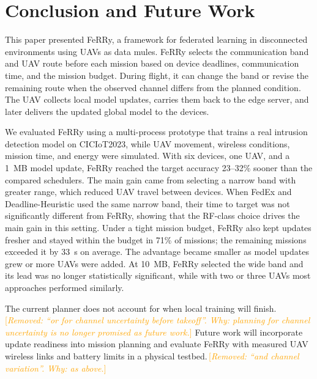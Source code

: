 \documentclass[conference]{IEEEtran}
\newcommand{\sysname}{FeRRy}
\newcommand{\changenote}[1]{\textcolor{orange}{\,[\emph{#1}]}}
\begin{document}
\section{Conclusion and Future Work}
\label{sec:conclusion}

This paper presented \sysname{}, a framework for federated learning in
disconnected environments using UAVs as data mules. \sysname{} selects the
communication band and UAV route before each mission based on device deadlines,
communication time, and the mission budget. During flight, it can change the
band or revise the remaining route when the observed channel differs from the
planned condition. The UAV collects local model updates, carries them back to
the edge server, and later delivers the updated global model to the devices.

We evaluated \sysname{} using a multi-process prototype that trains a real
intrusion detection model on CICIoT2023, while UAV movement, wireless
conditions, mission time, and energy were simulated. With six devices, one UAV,
and a 1~MB model update, \sysname{} reached the target accuracy 23--32\% sooner
than the compared schedulers. The main gain came from selecting a narrow band
with greater range, which reduced UAV travel between devices. When FedEx and
Deadline-Heuristic used the same narrow band, their time to target was not
significantly different from \sysname{}, showing that the RF-class choice
drives the main gain in this setting. Under a tight mission budget, \sysname{}
also kept updates fresher and stayed within the budget in 71\% of missions; the
remaining missions exceeded it by 33~s on average. The advantage became smaller
as model updates grew or more UAVs were added. At 10~MB, \sysname{} selected
the wide band and its lead was no longer statistically significant, while with
two or three UAVs most approaches performed similarly.

The current planner does not account for when local training will finish.\changenote{Removed: ``or for channel uncertainty before takeoff''. Why: planning for channel uncertainty is no longer promised as future work.}
Future work will incorporate update readiness into mission planning and evaluate
\sysname{} with measured UAV wireless links and battery limits in a physical
testbed.\changenote{Removed: ``and channel variation''. Why: as above.}

\end{document}
